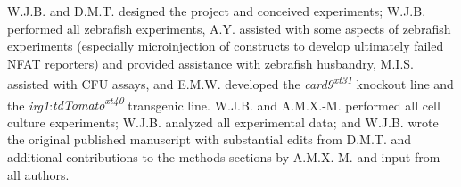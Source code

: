 W.J.B. and D.M.T. designed the project and conceived experiments; W.J.B. performed all zebrafish experiments, A.Y. assisted with some aspects of zebrafish experiments (especially microinjection of constructs to develop ultimately failed NFAT reporters) and provided assistance with zebrafish husbandry, M.I.S. assisted with CFU assays, and E.M.W. developed the \textit{card9\textsuperscript{xt31}} knockout line and the \textit{irg1}:\textit{tdTomato\textsuperscript{xt40}} transgenic line. W.J.B. and A.M.X.\hyp{}M. performed all cell culture experiments; W.J.B. analyzed all experimental data; and W.J.B. wrote the original published manuscript with substantial edits from D.M.T. and additional contributions to the methods sections by A.M.X.\hyp{}M. and input from all authors.



